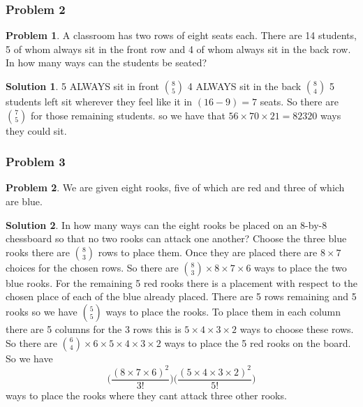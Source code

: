 \documentclass[10pt,a4paper,titlepage,twoside,draft]{article}
\theoremstyle{plain}
\theoremstyle{definition}
\newtheorem*{prob}{Problem}
\newtheorem*{sol}{Solution}
\theoremstyle{remark}
\begin{document}
\subsubsection{Problem 2}

\begin{prob}
A classroom has two rows of eight seats each. There are 14 students, 5 of whom always sit in the front row and 4 of whom always sit in the back row. In how many ways  can the students be seated?
\end{prob}

\medskip

\begin{sol}
5 ALWAYS sit in front $\binom{8}{5}$
4 ALWAYS sit in the back $\binom{8}{4}$
5 students left sit wherever they feel like it in $(16-9) = 7$ seats. So there are $\binom{7}{5}$ for those remaining students. 
so we have that $56 \times 70 \times 21 = 82320$ ways they could sit.
\end{sol}


\subsubsection{Problem 3}

\begin{prob}
We are given eight rooks, five of which are red and three of which are blue.
\end{prob}

\medskip

\begin{sol}
 In how many ways can the eight rooks be placed on an 8-by-8 chessboard so that no two rooks can attack one another?
 Choose the three blue rooks there are $\binom{8}{3}$ rows to place them. Once they are placed there are $8 \times 7$ choices for the chosen rows. 
 So there are $\binom{8}{3} \times 8 \times 7 \times 6$ ways to place the two blue rooks. 
 For the remaining 5 red rooks there is a placement with respect to the chosen place of each of the blue already placed. 
 There are 5 rows remaining and 5 rooks so we have $\binom{5}{5}$ ways to place the rooks. 
 To place them in each column there are 5 columns for the 3 rows this is $5 \times 4 \times 3 \times 2$ ways to choose these rows.
 So there are $\binom{6}{4} \times 6 \times 5 \times 4 \times 3 \times 2$ ways to place the 5 red rooks on the board.
 So we have \[ \bigg (\frac{(8 \times 7 \times 6)^{2}}{3!} \bigg )\bigg(\frac{(5 \times 4 \times 3 \times 2)^{2}}{5!}\bigg)\] 
ways to place the rooks where they cant attack three other rooks.
\end{sol}
\end{document}
